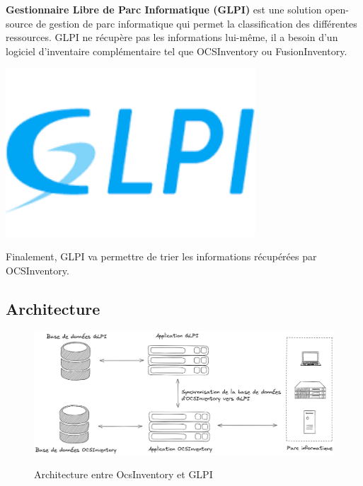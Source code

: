 \documentclass[12pt, a4paper, twoside]{article}
\begin{document}
\begin{minipage}{.7\textwidth}%
\textbf{Gestionnaire Libre de Parc Informatique (\gls{GLPI})} est une solution open-source de gestion de parc informatique qui permet la classification des différentes ressources. 
\gls{GLPI} ne récupère pas les informations lui-même, il a besoin d'un logiciel d'inventaire complémentaire tel que \gls{OCSInventory} ou FusionInventory.
\end{minipage}%
\hfill
\begin{minipage}{.3\textwidth}%
\begin{center}
\includegraphics[width=0.7\textwidth]{src/logo_glpi.png} 
\end{center}
\end{minipage}%

Finalement, \gls{GLPI} va permettre de trier les informations récupérées par \gls{OCSInventory}.

\subsection{Architecture}
\begin{figure}[!ht]
    \centering
    \includegraphics[width=\textwidth]{src/graph_glpi.png}
    \label{fig:glpi}
    \caption{Architecture entre OcsInventory et \gls{GLPI}}
\end{figure}
\end{document}
